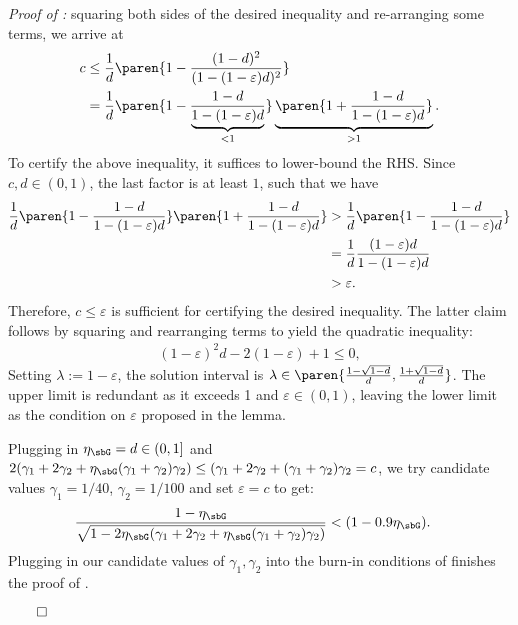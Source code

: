 \textit{Proof of :} squaring both sides of the desired inequality and re-arranging some terms, we arrive at
\begin{align*}
    c  &\leq \frac{1}{d}\paren{1 - \frac{(1- d)^2}{(1 - (1-\varepsilon)d)^2}} \\
    &= \frac{1}{d}\paren{1 - \frac{1- d}{\underbrace{1 - (1-\varepsilon)d}_{< 1}}} \underbrace{\paren{1 + \frac{1- d}{1 - (1-\varepsilon)d}}}_{> 1}.
\end{align*}
To certify the above inequality, it suffices to lower-bound the RHS. Since $c, d \in (0,1)$, the last factor is at least $1$, such that we have
\begin{align*}
    \frac{1}{d}\paren{1 - \frac{1- d}{1 - (1-\varepsilon)d}} \paren{1 + \frac{1- d}{1 - (1-\varepsilon)d}} &>  \frac{1}{d}\paren{1 - \frac{1- d}{1 - (1-\varepsilon)d}} \\
    &= \frac{1}{d}\frac{(1 - \varepsilon) d}{1 - (1-\varepsilon)d} \\
    &> \varepsilon .
\end{align*}
Therefore, $c \leq \varepsilon $ is sufficient for certifying the desired inequality. The latter claim follows by squaring and rearranging terms to yield the quadratic inequality:
\begin{align*}
    (1-\varepsilon)^2  d - 2(1-\varepsilon) + 1 \leq 0,
\end{align*}
Setting $\lambda := 1-\varepsilon$, the solution interval is $\lambda \in \paren{\frac{1-\sqrt{1- d}}{ d}, \frac{1 + \sqrt{1- d}}{ d}}$. The upper limit is redundant as it exceeds 1 and $\varepsilon \in (0,1)$, leaving the lower limit as the condition on $\varepsilon$ proposed in the lemma.

Plugging in $\eta_\sbG = d \in (0,1]$ and $2(\gamma_1 + 2\gamma_2 + \eta_\sbG(\gamma_1 + \gamma_2)\gamma_2) \leq (\gamma_1 + 2\gamma_2 + (\gamma_1 + \gamma_2)\gamma_2 = c$, we try candidate values $\gamma_1 =1/40$, $\gamma_2 = 1/100$ and set $\varepsilon=c$ to get:
\begin{align*}
    \frac{1-\eta_\sbG}{\sqrt{1 - 2\eta_\sbG(\gamma_1 + 2\gamma_2 + \eta_\sbG(\gamma_1 + \gamma_2)\gamma_2)}} &< (1 - 0.9\eta_\sbG).
\end{align*}
Plugging in our candidate values of $\gamma_1, \gamma_2$ into the burn-in conditions of  finishes the proof of .


$\qedhere$


\LinRepMainThm*





